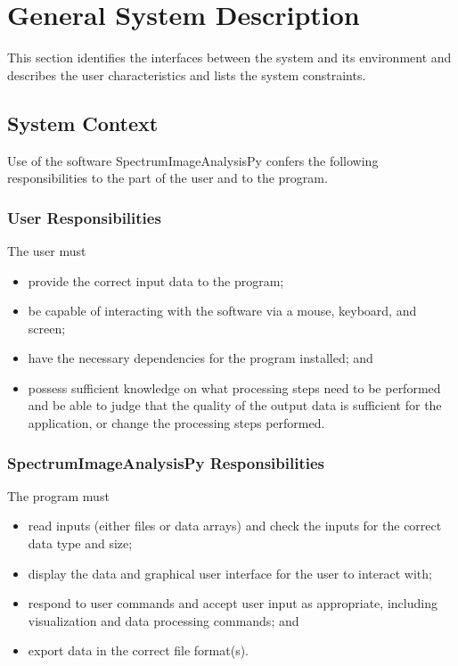 \documentclass[12pt]{article}
\newcommand{\progname}{SpectrumImageAnalysisPy} %
\begin{document}
\section{General System Description}

This section identifies the interfaces between the system and its environment
and describes the user characteristics and lists the system constraints.

\subsection{System Context}

Use of the software \progname{} confers the following responsibilities to the
part of the user and to the program.

\subsubsection{User Responsibilities}
The user must
\begin{itemize}
	\item provide the correct input data to the program;
	\item be capable of interacting with the software via a mouse, keyboard, and
screen;
	\item have the necessary dependencies for the program installed; and
	\item possess sufficient knowledge on what processing steps need to be
performed and be able to judge that the quality of the output data is sufficient
for the application, or change the processing steps performed.
\end{itemize}
    
\subsubsection{\progname{} Responsibilities}
The program must
\begin{itemize}
	\item read inputs (either files or data arrays) and check the inputs for the
correct data type and size;
	\item display the data and graphical user interface for the user to interact
with;
	\item respond to user commands and accept user input as appropriate, including
visualization and data processing commands; and
	\item export data in the correct file format(s).
\end{itemize}
\end{document}
